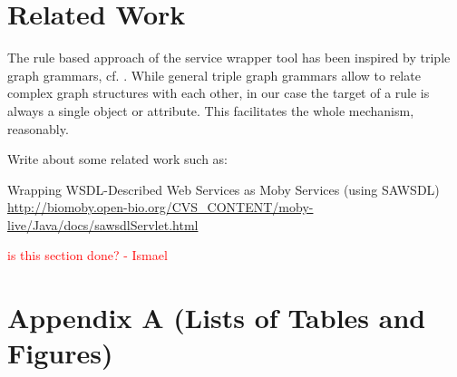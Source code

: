 \documentclass{fast_latex}
\begin{document}

\clearpage
\section{Related Work} %
\label{sec:related_work}

The rule based approach of the service wrapper tool has been inspired by triple graph grammars, cf. \cite{conf/wg/Schurr94,JSZ97c}. While general triple graph grammars allow to relate complex graph structures with each other, in our case the target of a rule is always a single object or attribute. This facilitates the whole mechanism, reasonably. 

Write about some related work such as:

Wrapping WSDL-Described Web Services as Moby Services (using SAWSDL)
\url{http://biomoby.open-bio.org/CVS_CONTENT/moby-live/Java/docs/sawsdlServlet.html}

\textcolor{red}{is this section done? - Ismael}


\clearpage



\clearpage
\doublespacing
\section*{Appendix A (Lists of Tables and Figures)}

\listoftables

\listoffigures
\end{document}
